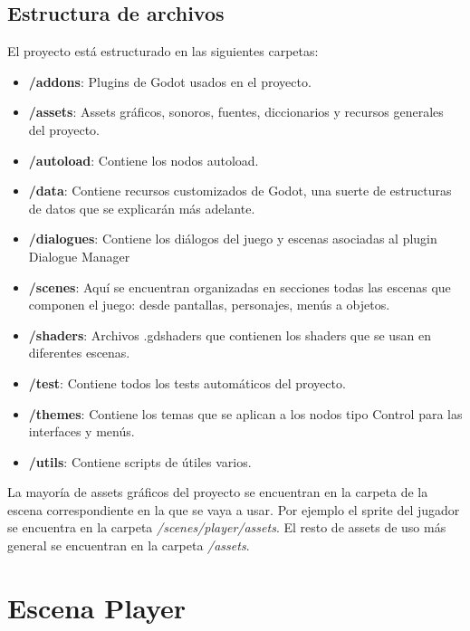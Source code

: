 \subsection{Estructura de archivos}

El proyecto está estructurado en las siguientes carpetas:

\begin{itemize}
    \item \textbf{/addons}: Plugins de Godot usados en el proyecto.
    \item \textbf{/assets}: Assets gráficos, sonoros, fuentes, diccionarios y recursos generales del proyecto.
    \item \textbf{/autoload}: Contiene los nodos autoload.
    \item \textbf{/data}: Contiene recursos customizados de Godot, una suerte de estructuras de datos que se explicarán más adelante.
    \item \textbf{/dialogues}: Contiene los diálogos del juego y escenas asociadas al plugin Dialogue Manager %
    \item \textbf{/scenes}: Aquí se encuentran organizadas en secciones todas las escenas que componen el juego: desde pantallas, personajes, menús a objetos.
    \item \textbf{/shaders}: Archivos .gdshaders que contienen los shaders que se usan en diferentes escenas.
    \item \textbf{/test}: Contiene todos los tests automáticos del proyecto.
    \item \textbf{/themes}: Contiene los temas que se aplican a los nodos tipo Control para las interfaces y menús.
    \item \textbf{/utils}: Contiene scripts de útiles varios.
\end{itemize}

La mayoría de assets gráficos del proyecto se encuentran en la carpeta de la escena correspondiente en la que se vaya a usar. Por ejemplo el sprite del jugador se encuentra en la carpeta \textit{/scenes/player/assets}. El resto de assets de uso más general se encuentran en la carpeta \textit{/assets}.

\section{Escena Player}

